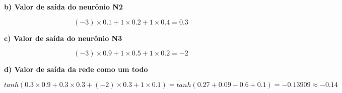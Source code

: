 \begin{adjustwidth}{1em}{}
\textbf{b) Valor de saída do neurônio N2}
\end{adjustwidth}
\begin{equation*}
    (-3)\times0.1 + 1\times0.2 + 1\times0.4 = 0.3
\end{equation*}

\begin{adjustwidth}{1em}{}
\textbf{c) Valor de saída do neurônio N3}
\end{adjustwidth}
\begin{equation*}
    (-3)\times0.9 + 1\times0.5 + 1\times0.2 = -2
\end{equation*}

\begin{adjustwidth}{1em}{}
\textbf{d) Valor de saída da rede como um todo}
\end{adjustwidth}
\begin{equation*}
    tanh(0.3\times0.9 + 0.3\times0.3 + (-2)\times0.3 + 1\times0.1) = tanh(0.27 + 0.09 - 0.6 + 0.1) = -0.13909 \approx -0.14
\end{equation*}